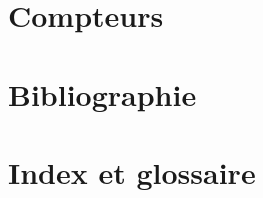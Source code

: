 \documentclass{article}
\begin{document}
\begin{multicols*}{3}




\section*{Compteurs}
\begin{latexcode}
    \setlength{parameters}{length}
\end{latexcode}

\section*{Bibliographie}
\begin{latexcode}

    \usepackage[style=numeric,backend=biber]{biblatex}
    
    \cite{key}           %
    \citep{key}          %
    \citet{key}          %
    \nocite{*}           %
    \printbibliography   %
\end{latexcode}

\section*{Index et glossaire}
\begin{latexcode}
    \usepackage{makeidx}
    \makeindex
    \printindex          %


\end{latexcode}
\end{multicols*}
\end{document}
